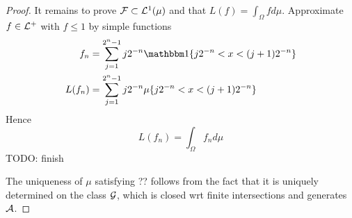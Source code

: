 \begin{proof}
  It remains to prove $\mathcal{F} \subset \mathcal{L}^1(\mu)$ and that
  $L(f) = \int_\Omega f d\mu$. Approximate $f \in \mathcal{L}^+$ with $f \leq 1$
  by simple functions
  \begin{align*}
    f_n &= \sum_{j=1}^{2^n - 1} j 2^{-n} \ind\{j 2^{-n} < x < (j+1) 2^{-n}\} \\
    L(f_n) &= \sum_{j=1}^{2^n - 1} j 2^{-n} \mu\{j 2^{-n} < x < (j+1) 2^{-n}\}
  \end{align*}
  Hence
  \[
    L(f_n) = \int_\Omega f_n d\mu
  \]
  TODO: finish

  The uniqueness of $\mu$ satisfying ?? follows from the fact that it is
  uniquely determined on the class $\mathcal{G}$, which is closed wrt finite
  intersections and generates $\mathcal{A}$.
\end{proof}



